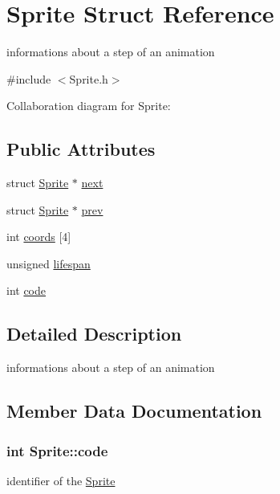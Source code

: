 \hypertarget{structSprite}{}\section{Sprite Struct Reference}
\label{structSprite}


informations about a step of an animation  




{\ttfamily \#include $<$Sprite.\+h$>$}



Collaboration diagram for Sprite\+:
\subsection*{Public Attributes}
\begin{DoxyCompactItemize}
\item 
struct \hyperlink{structSprite}{Sprite} $\ast$ \hyperlink{structSprite_a52b8df63621811a2835cd11ba69cebfb}{next}
\item 
struct \hyperlink{structSprite}{Sprite} $\ast$ \hyperlink{structSprite_a2c09859f5f18f9d8272171eb43bf66e8}{prev}
\item 
int \hyperlink{structSprite_a63a82c9db293f2a0b9a043894cea93ce}{coords} \mbox{[}4\mbox{]}
\item 
unsigned \hyperlink{structSprite_ac7deb2af6710a22bec013f2214fc0df7}{lifespan}
\item 
int \hyperlink{structSprite_aa976ea2b2a02cfa09237ea61b70d5697}{code}
\end{DoxyCompactItemize}


\subsection{Detailed Description}
informations about a step of an animation 

\subsection{Member Data Documentation}
\subsubsection[{\texorpdfstring{code}{code}}]{\setlength{\rightskip}{0pt plus 5cm}int Sprite\+::code}\hypertarget{structSprite_aa976ea2b2a02cfa09237ea61b70d5697}{}\label{structSprite_aa976ea2b2a02cfa09237ea61b70d5697}
identifier of the \hyperlink{structSprite}{Sprite} 
